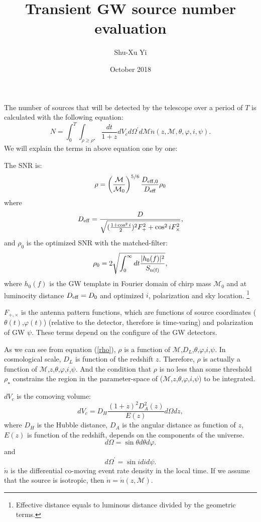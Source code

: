 \documentclass[fleqn,usenatbib]{mnras}
\title{Transient GW source number evaluation}
\author{Shu-Xu Yi}
\date{October 2018}
\begin{document}
\maketitle
The number of sources that will be detected by the telescope over a period of $T$ is calculated with the following equation:
\begin{equation}
    N=\int^T_0\int_{\rho\ge\rho^\star}\frac{dt}{1+z}dV_cd\Omega^\prime d\mathcal{M}\dot{n}(z,\mathcal{M},\theta,\varphi,i,\psi).
\end{equation}
We will explain the terms in above equation one by one:

The SNR is:
\begin{equation}
    \rho=\left(\frac{\mathcal{M}}{\mathcal{M}_0}\right)^{5/6}\frac{D_{\rm{eff},0}}{D_{\rm{eff}}}\rho_0
    \label{rho}
\end{equation}
where 
\begin{equation}
    D_{\rm{eff}}=\frac{D}{\sqrt{(\frac{1+\cos^2i}{2})^2F^2_++\cos^2iF^2_\times}}, 
\end{equation}
and $\rho_0$ is the optimized SNR with the matched-filter:
\begin{equation}
    \rho_0=2\sqrt{\int^\infty_0dt\frac{|h_0(f)|^2}{S_{\rm{n}(f)}}},
\end{equation}
where $h_0(f)$ is the GW template in Fourier domain of chirp mass $\mathcal{M}_0$ and at luminocity distance $D_{\rm{eff}}=D_0$ and optimized $i$, polarization and sky location. \footnote{Effective distance equals to luminous distance divided by the geometric terms.}

$F_{+,\times}$ is the antenna pattern functions, which are functions of source coordinates ($\theta(t)$,$\varphi(t)$) (relative to the detector, therefore is time-varing) and polarization of GW $\psi$. These terms depend on the configure of the GW detectors. 

As we can see from equation (\ref{rho}), $\rho$ is a function of $\mathcal{M}$,$D_L$,$\theta$,$\varphi$,$i$,$\psi$. In cosmological scale, $D_L$ is function of the redshift $z$. Therefore, $\rho$ is actually a function of $\mathcal{M}$,$z$,$\theta$,$\varphi$,$i$,$\psi$. And the condition that $\rho$ is no less than some threshold $\rho_\star$ constrains the region in the parameter-space of ($\mathcal{M}$,$z$,$\theta$,$\varphi$,$i$,$\psi$) to be integrated. 

$dV_c$ is the comoving volume:
\begin{equation}
    dV_c=D_H\frac{(1+z)^2D^2_A(z)}{E(z)}d\Omega dz,
\end{equation}
where 
$D_H$ is the Hubble distance, $D_A$ is the angular distance as function of $z$, $E(z)$ is function of the redshift, depends on the components of the universe. 
\begin{equation}
    d\Omega=\sin\theta d\theta d\varphi. 
\end{equation}
and 
\begin{equation}
    d\Omega^\prime=\sin idid\psi. 
\end{equation}
$\dot{n}$ is the differential co-moving event rate density in the local time. If we assume that the source is isotropic, then $\dot{n}=\dot{n}(z,\mathcal{M})$. 
\end{document}
